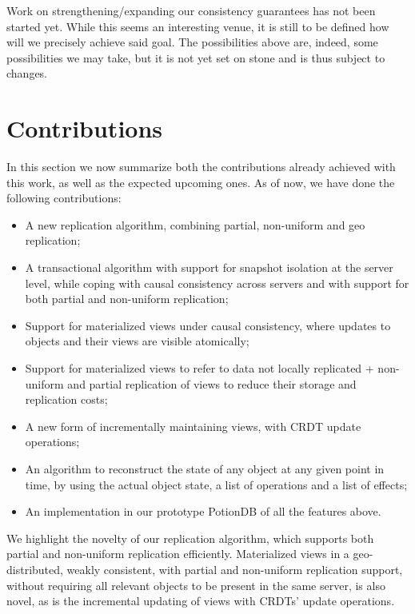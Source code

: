 Work on strengthening/expanding our consistency guarantees has not been started yet.
While this seems an interesting venue, it is still to be defined how will we precisely achieve said goal.
The possibilities above are, indeed, some possibilities we may take, but it is not yet set on stone and is thus subject to changes.


\section{Contributions}
\label{sec:contributions}

In this section we now summarize both the contributions already achieved with this work, as well as the expected upcoming ones.
As of now, we have done the following contributions:

\begin{itemize}
	\item A new replication algorithm, combining partial, non-uniform and geo replication;
	\item A transactional algorithm with support for snapshot isolation at the server level, while coping with causal consistency across servers and with support for both partial and non-uniform replication;
	\item Support for materialized views under causal consistency, where updates to objects and their views are visible atomically;
	\item Support for materialized views to refer to data not locally replicated + non-uniform and partial replication of views to reduce their storage and replication costs;
	\item A new form of incrementally maintaining views, with CRDT update operations;
	\item An algorithm to reconstruct the state of any object at any given point in time, by using the actual object state, a list of operations and a list of effects;
	\item An implementation in our prototype PotionDB of all the features above.
\end{itemize}

We highlight the novelty of our replication algorithm, which supports both partial and non-uniform replication efficiently.
Materialized views in a geo-distributed, weakly consistent, with partial and non-uniform replication support, without requiring all relevant objects to be present in the same server, is also novel, as is the incremental updating of views with CRDTs' update operations.

